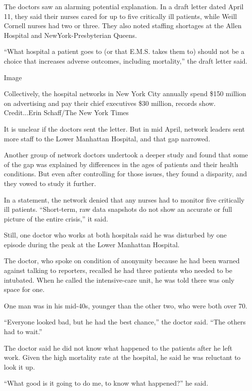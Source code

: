 The doctors saw an alarming potential explanation. In a draft letter
dated April 11, they said their nurses cared for up to five critically
ill patients, while Weill Cornell nurses had two or three. They also
noted staffing shortages at the Allen Hospital and NewYork-Presbyterian
Queens.

``What hospital a patient goes to (or that E.M.S. takes them to) should
not be a choice that increases adverse outcomes, including mortality,''
the draft letter said.

Image

Collectively, the hospital networks in New York City annually spend
\$150 million on advertising and pay their chief executives \$30
million, records show. Credit...Erin Schaff/The New York Times

It is unclear if the doctors sent the letter. But in mid April, network
leaders sent more staff to the Lower Manhattan Hospital, and that gap
narrowed.

Another group of network doctors undertook a deeper study and found that
some of the gap was explained by differences in the ages of patients and
their health conditions. But even after controlling for those issues,
they found a disparity, and they vowed to study it further.

In a statement, the network denied that any nurses had to monitor five
critically ill patients. ``Short-term, raw data snapshots do not show an
accurate or full picture of the entire crisis,'' it said.

Still, one doctor who works at both hospitals said he was disturbed by
one episode during the peak at the Lower Manhattan Hospital.

The doctor, who spoke on condition of anonymity because he had been
warned against talking to reporters, recalled he had three patients who
needed to be intubated. When he called the intensive-care unit, he was
told there was only space for one.

One man was in his mid-40s, younger than the other two, who were both
over 70.

``Everyone looked bad, but he had the best chance,'' the doctor said.
``The others had to wait.''

The doctor said he did not know what happened to the patients after he
left work. Given the high mortality rate at the hospital, he said he was
reluctant to look it up.

``What good is it going to do me, to know what happened?'' he said.

